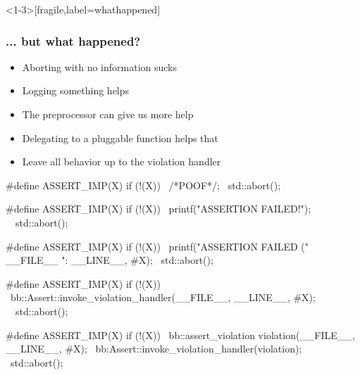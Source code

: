 \begin{frame}<1-3>[fragile,label=whathappened]
  \frametitle{... but what happened?}
\begin{itemize}
\item<1-> Aborting with no information sucks
\item<2-> Logging something helps
\item<3-> The preprocessor can give us more help
\item<4-> Delegating to a pluggable function helps that
\item<6-> Leave all behavior up to the violation handler
\end{itemize}
\begin{overprint}
\begin{cppcodebox}
#define ASSERT_IMP(X) if (!(X)) {                                   \
    /*POOF*/;                                                       \
    std::abort();                                                   \
}
\end{cppcodebox}

\begin{cppcodebox}
#define ASSERT_IMP(X) if (!(X)) {                                   \
    printf("ASSERTION FAILED!\n");                                  \
                                                                    \
    std::abort();                                                   \
}
\end{cppcodebox}

\onslide<3>
\begin{cppcodebox}
#define ASSERT_IMP(X) if (!(X)) {                                   \
    printf("ASSERTION FAILED (" __FILE__ ":%
                                __LINE__, #X);                      \
    std::abort();                                                   \
}
\end{cppcodebox}

\onslide<4>
\begin{cppcodebox}
#define ASSERT_IMP(X) if (!(X)) {                                   \
    bb::Assert::invoke_violation_handler(__FILE__, __LINE__, #X);   \
                                                                    \
    std::abort();                                                   \
}
\end{cppcodebox}

\onslide<5>
\begin{cppcodebox}
#define ASSERT_IMP(X) if (!(X)) {                                   \
    bb::assert_violation violation(__FILE__, __LINE__, #X); \
    bb:Assert::invoke_violation_handler(violation);                 \
    std::abort();                                                   \
}
\end{cppcodebox}


\end{overprint}
\end{frame}

